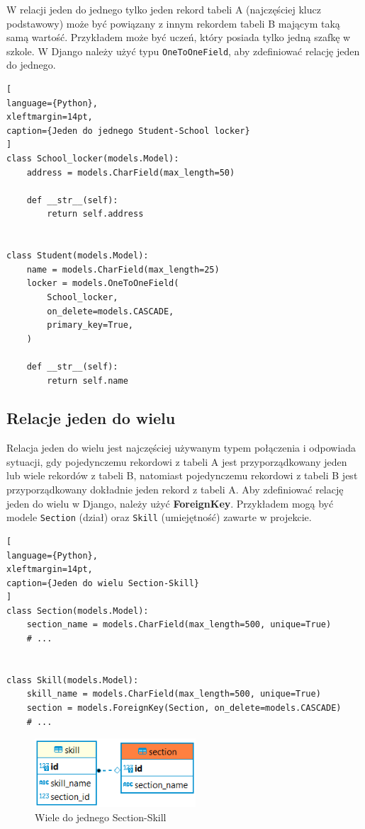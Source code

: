 \documentclass[oneside,polski,logo,indent]{amuthesis}
\begin{document}
W relacji jeden do jednego tylko jeden rekord tabeli A (najczęściej klucz podstawowy) może być powiązany z innym rekordem tabeli B mającym taką samą wartość. Przykładem może być uczeń, który posiada tylko jedną szafkę w szkole.
W Django należy użyć typu \texttt{OneToOneField}, aby zdefiniować relację jeden do jednego.
\begin{lstlisting}[
language={Python},
xleftmargin=14pt,
caption={Jeden do jednego Student-School locker}
]
class School_locker(models.Model):
    address = models.CharField(max_length=50)

    def __str__(self):
        return self.address


class Student(models.Model):
    name = models.CharField(max_length=25)
    locker = models.OneToOneField(
        School_locker,
        on_delete=models.CASCADE,
        primary_key=True,
    )

    def __str__(self):
        return self.name
\end{lstlisting}

\begin{center}
\subsection{Relacje jeden do wielu}
\end{center}

Relacja jeden do wielu jest najczęściej używanym typem połączenia i odpowiada sytuacji, gdy pojedynczemu rekordowi z tabeli A jest przyporządkowany jeden lub wiele rekordów z tabeli B, natomiast pojedynczemu rekordowi z tabeli B jest przyporządkowany dokładnie jeden rekord z tabeli A.
Aby zdefiniować relację jeden do wielu w Django, należy użyć \textbf{ForeignKey}. Przykładem mogą być modele \texttt{Section} (dział) oraz \texttt{Skill} (umiejętność) zawarte w projekcie.  \newpage 
\begin{lstlisting}[
language={Python},
xleftmargin=14pt,
caption={Jeden do wielu Section-Skill}
]
class Section(models.Model):
    section_name = models.CharField(max_length=500, unique=True)
	# ...


class Skill(models.Model):
    skill_name = models.CharField(max_length=500, unique=True)
    section = models.ForeignKey(Section, on_delete=models.CASCADE)
	# ...

\end{lstlisting}

\begin{figure}[H]
  \centering
  \includegraphics[width=6cm]{skillsec.png}
  \caption{Wiele do jednego Section-Skill}
  \label{obraz-przyklad}
\end{figure}
\end{document}
